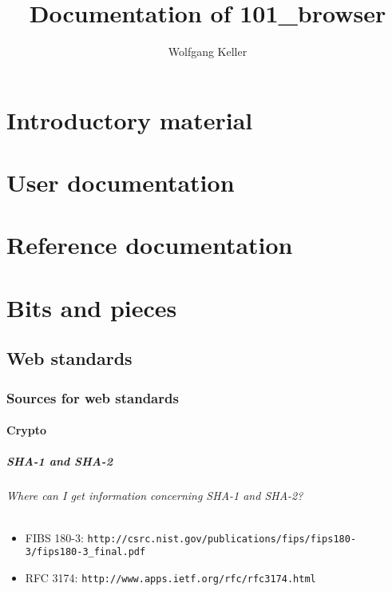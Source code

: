 \documentclass[10pt]{scrbook}
\author{Wolfgang Keller}
\title{Documentation of 101\_browser}
\begin{document}
\maketitle
\tableofcontents

\part{Introductory material}

\part{User documentation}

\part{Reference documentation}

\part{Bits and pieces}

\chapter{Web standards}

\section{Sources for web standards}

\subsection{Crypto}

\subsubsection{SHA-1 and SHA-2}

\paragraph{Where can I get information concerning SHA-1 and SHA-2?}
\begin{itemize}
\item FIBS 180-3: \verb|http://csrc.nist.gov/publications/fips/fips180-3/fips180-3_final.pdf|
\item RFC 3174: \verb|http://www.apps.ietf.org/rfc/rfc3174.html|
\end{itemize}
\end{document}
